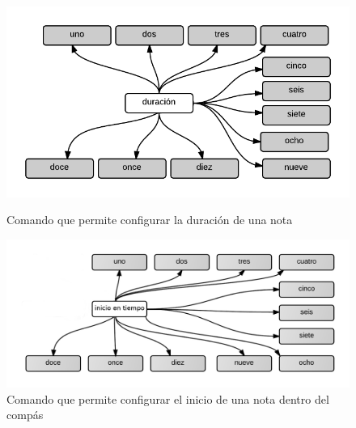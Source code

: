 \begin{figure}[H]
\begin{minipage}[b]{0.5\linewidth}
\centering
\includegraphics[width=0.9\linewidth]{./graphics/cmd-dur.png}
\caption{Comando que permite configurar la duraci\'on de una nota}
\label{figure:cmd-dur}
\end{minipage}
\quad
\begin{minipage}[b]{0.5\linewidth}
\centering
\includegraphics[width=1.1\linewidth]{./graphics/cmd-note-tiempo.png}
\caption{Comando que permite configurar el inicio de una nota dentro del comp\'as}
\label{figure:cmd-note-tiempo}
\end{minipage}
\end{figure}
